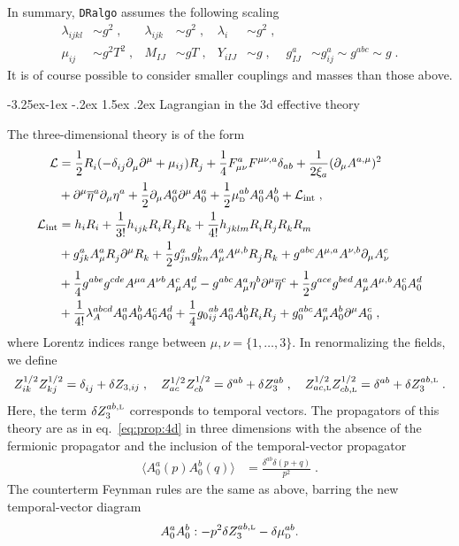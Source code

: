 \documentclass[11pt]{article}
\makeatletter
\def\dralgo{{\tt DRalgo}}
\renewcommand{\nn}{\nonumber \\}
\newcommand{\rmii}[1]{{\mbox{\tiny\rm{#1}}}}
\renewcommand\subsection{\@startsection{subsection}{2}{\z@}%
  {-3.25ex\@plus -1ex \@minus -.2ex}%
  {1.5ex \@plus .2ex}%
  {\normalfont\normalsize\bfseries}}
\makeatother
\begin{document}
In summary, \dralgo{} assumes the following scaling
\begin{align}
\label{eq:AssumedScaling}
  \lambda_{ijkl} &\sim g^2\;,
  &
  \lambda_{ijk} &\sim g^2\;,
  &
  \lambda_{i} &\sim g^2\;,
  \nn
  \mu_{ij} &\sim g^2 T^2\;,
  &
  M_{IJ} &\sim g T\;,
  &
  Y_{i IJ} &\sim g\;,
  &
  g^{a}_{IJ} &\sim g^{a}_{ij}\sim g^{abc}\sim g
  \;.
\end{align}
It is of course possible to consider smaller couplings and masses than those above.

\subsection{Lagrangian in the 3d effective theory}

The three-dimensional theory is of the form
\begin{align}
\mathcal{L}&=
    \frac{1}{2} R_{i}^{ }(-\delta_{ij}^{ }\partial_\mu^{ } \partial^\mu+\mu_{ij}) R_{j}^{ }
  + \frac{1}{4}F_{\mu\nu}^a F^{\mu\nu,a}\delta_{ab}
  + \frac{1}{2\xi_a}(\partial_\mu A^{a,\mu})^2
  \nn &
  + \partial^\mu \overline{\eta}^a \partial_\mu \eta^a
  + \frac{1}{2} \partial_\mu A_0^a \partial^\mu A_0^a
  + \frac{1}{2} \mu_{\rmii{D}}^{ab} A_0^a  A_0^b
  + \mathcal{L}_\text{int}
  \;,\\
\mathcal{L}_\text{int}&=
   h_{i} R_{i}+ \frac{1}{3!}h_{ijk}^{ } R_{i}^{ } R_{j}^{ } R_{k}^{ }
  + \frac{1}{4!}h_{jklm}^{ }R_{i}^{ } R_{j}^{ } R_{k}^{ } R_{m}^{ }
  \nn &
  + g_{jk}^{a} A^a_\mu  R_{j}^{ } \partial^\mu R_{k}^{ }
  + \frac{1}{2}g^a_{jn}g^b_{kn}A_\mu^a A^{\mu,b}R_{j}^{ } R_{k}^{ }
  + g^{abc}A^{\mu,a}A^{\nu,b}\partial_\mu A^c_\nu
  \nn &
  + \frac{1}{4}g^{abe}g^{cde}A^{\mu a}A^{\nu b}A_{\mu}^c A_\nu^d
  - g^{abc}A_\mu^a \eta^b \partial^\mu \overline{\eta}^c+\frac{1}{2}g^{ace}g^{bed}A_\mu^a A^{\mu,b}A_{0}^{ c} A_{0}^{ d}
  \nn &
  + \frac{1}{4!}\lambda_A^{abcd}A_0^a A_0^b A_0^c A_0^d
  + \frac{1}{4}{g_0}_{ij}^{ab} A_0^a A_0^b R_{i}^{ } R_{j}^{ }
  + g_{0}^{abc} A_\mu^a A_0^b \partial^\mu A_0^c
  \;,
\end{align}
where Lorentz indices range between $\mu,\nu =\{1,\dots,3\}$.
In renormalizing the fields,
we define 
\begin{align}
  Z^{1/2}_{i k}Z^{1/2}_{k j}=
    \delta_{ij}^{ }
  + \delta Z_{3,ij}
  \;,\quad
  Z^{1/2}_{a c}Z^{1/2}_{c b} = 
    \delta^{ab}
  + \delta Z^{ab}_3
  \;,\quad
    Z^{1/2}_{a c,\rmii{L}}
    Z^{1/2}_{c b,\rmii{L}} =
    \delta^{ab}
  + \delta Z^{ab,\rmii{L}}_3
  \;.
\end{align}
Here,
the term $\delta Z^{ab,\rmii{L}}_3$ corresponds to temporal vectors.
%
The propagators of this theory are
as in eq.~\eqref{eq:prop:4d} in three dimensions with
the absence of the fermionic propagator and
the inclusion of the temporal-vector propagator
\begin{align}
\label{eq:prop:3d}
  \langle A_0^a (p) A_0^b (q) \rangle &= \frac{\delta^{ab}\delta(p+q)}{p^2}
  \;.
\end{align}
The counterterm Feynman rules are the same as above,
barring the new temporal-vector diagram
\begin{align}
A_0^a A_0^b:
  - p^2\delta Z^{ab,\rmii{L}}_3
  - \delta \mu_{\rmii{D}}^{ab}.
\end{align}
\end{document}
